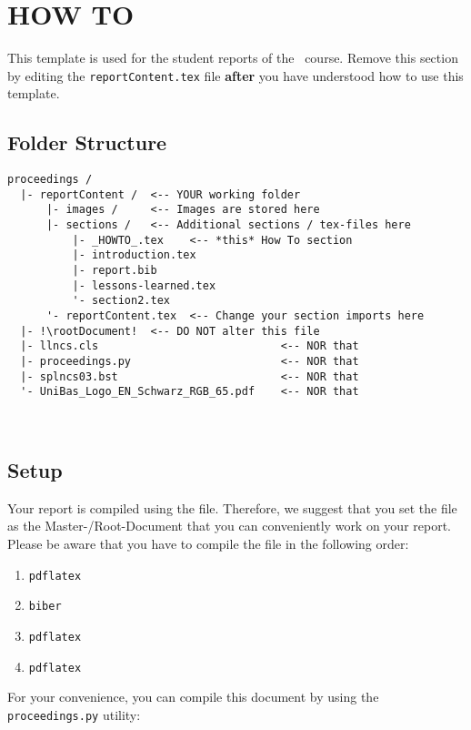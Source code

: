 \section*{HOW TO}
\label{sec:usage}
This template is used for the student reports of the \coursename\ course. Remove this section by editing the \texttt{reportContent.tex} file \textbf{after} you have understood how to use this template.

\subsection*{Folder Structure}
\begin{lstlisting}[escapechar=!]
proceedings /
  |- reportContent /  <-- YOUR working folder
      |- images /     <-- Images are stored here
      |- sections /   <-- Additional sections / tex-files here
          |- _HOWTO_.tex    <-- *this* How To section
          |- introduction.tex
          |- report.bib
          |- lessons-learned.tex
          '- section2.tex
      '- reportContent.tex  <-- Change your section imports here
  |- !\rootDocument!  <-- DO NOT alter this file
  |- llncs.cls                            <-- NOR that
  |- proceedings.py                       <-- NOR that
  |- splncs03.bst                         <-- NOR that
  '- UniBas_Logo_EN_Schwarz_RGB_65.pdf    <-- NOR that
\end{lstlisting}
\ 

\subsection*{Setup}
Your report is compiled using the \texttt{\rootDocument} file. Therefore, we suggest that you set the file \texttt{\rootDocument} as the Master-/Root-Document that you can conveniently work on your report.
Please be aware that you have to compile the \texttt{\rootDocument} file in the following order:

\begin{enumerate}
    \item \verb|pdflatex| \rootDocument
    \item \verb|biber| \rootName
    \item \verb|pdflatex| \rootDocument
    \item \verb|pdflatex| \rootDocument
\end{enumerate}

For your convenience, you can compile this document by using the \texttt{proceedings.py} utility:

